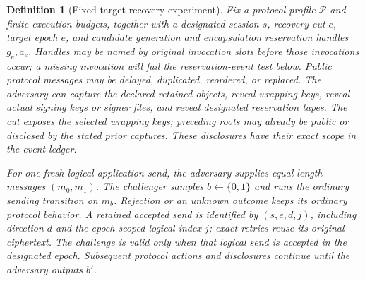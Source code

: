 \documentclass[pdflatex]{sn-jnl}
\theoremstyle{thmstyleone}
\theoremstyle{thmstylethree}
\newtheorem{definition}[theorem]{Definition}
\theoremstyle{thmstyletwo}
\begin{document}
\begin{definition}[Fixed-target recovery experiment]
\label{def:recovery-game}
Fix a protocol profile $\mathcal P$ and finite execution budgets, together with
a designated session $s$, recovery cut $c$, target epoch $e$, and candidate
generation and encapsulation reservation handles $g_e,a_e$.  Handles may be
named by original invocation slots before those invocations occur; a missing
invocation will fail the reservation-event test below.  Public
protocol messages may be delayed, duplicated, reordered, or replaced.
The adversary can capture the declared retained objects, reveal wrapping
keys, reveal actual signing keys or signer files, and reveal designated
reservation tapes.  The cut exposes the selected wrapping keys; preceding
roots may already be public or disclosed by the stated prior captures.
These disclosures have their exact scope in the event ledger.

For one fresh logical application send, the adversary supplies equal-length
messages $(m_0,m_1)$.  The challenger samples $b\leftarrow\{0,1\}$ and runs
the ordinary sending transition on $m_b$.  Rejection or an unknown outcome
keeps its ordinary protocol behavior.  A retained accepted send is identified
by $(s,e,d,j)$, including direction $d$ and the epoch-scoped logical index $j$;
exact retries reuse its original ciphertext.  The challenge is valid only
when that logical send is accepted in the designated epoch.  Subsequent
protocol actions and disclosures continue until the adversary outputs $b'$.
\end{definition}
\end{document}
